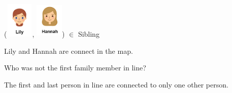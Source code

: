 \documentclass{ximera}
\begin{document}
\begin{exercise}
 ({\includegraphics[width=50px,height=65px]{pics/people/lily.png}}, {\includegraphics[width=50px,height=65px]{pics/people/hannah.png}}) $\in$ Sibling 

  \begin{multipleChoice}
  \end{multipleChoice}
  \begin{feedback}
Lily and Hannah are connect in the map.
  \end{feedback}
\end{exercise}












\begin{exercise}
Who was not the first family member in line?

  \begin{selectAll}
  \end{selectAll}
  \begin{feedback}
The first and last person in line are connected to only one other person.
  \end{feedback}
\end{exercise}
\end{document}
